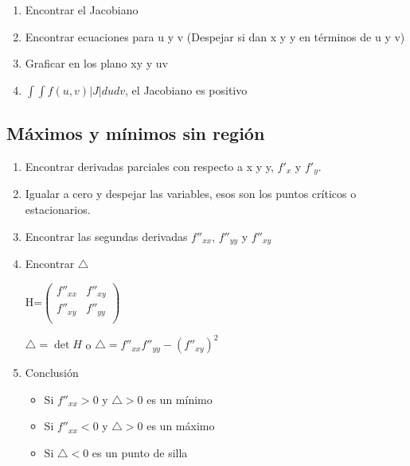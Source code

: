 \begin{enumerate}
	\item Encontrar el Jacobiano
	\item Encontrar ecuaciones para u y v (Despejar si dan x y y en términos de u y v)
	\item Graficar en los plano xy y uv
	\item $\int\int f(u,v)|J|dudv$, el Jacobiano es positivo 
	
\end{enumerate}



\subsection{Máximos y mínimos sin región}
\begin{enumerate}
	\item Encontrar derivadas parciales con respecto a x y y, $f'_{x}$ y $f'_{y}$.
	\item Igualar a cero y despejar las variables, esos son los puntos críticos o estacionarios.
	\item Encontrar las segundas derivadas $f''_{xx}$, $f''_{yy}$ y $f''_{xy}$
	\item Encontrar $\triangle$
	
	H=$\begin{pmatrix}
	f''_{xx} & f''_{xy} \\
	f''_{xy} & f''_{yy} \\
	\end{pmatrix}$
	
	$\triangle=\det H$ o $\triangle = f''_{xx}f''_{yy}-(f''_{xy})^2$
	\item Conclusión 
	\begin{itemize}
		\item Si $f''_{xx}>0$ y $\triangle>0$ es un mínimo
		\item Si $f''_{xx}<0$ y $\triangle>0$ es un máximo
		\item Si $\triangle<0$ es un punto de silla
	\end{itemize}
\end{enumerate}

